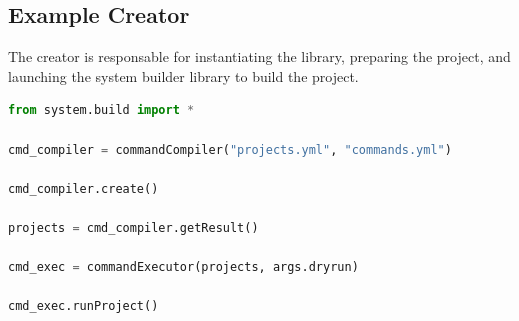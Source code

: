 \subsection{Example Creator}
\par
The creator is responsable for instantiating the library, preparing the project, and launching the system builder library to build the project.
\begin{lstlisting}[language=Python]
from system.build import *

cmd_compiler = commandCompiler("projects.yml", "commands.yml")

cmd_compiler.create()

projects = cmd_compiler.getResult()

cmd_exec = commandExecutor(projects, args.dryrun)

cmd_exec.runProject()

\end{lstlisting}


